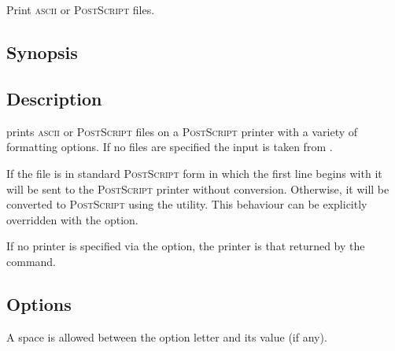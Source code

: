 
\newpage
\section{}
\label{pri}



Print \textsc{ascii} or \textsc{PostScript} files.

\subsection*{Synopsis}

\begin{synopsis}
\end{synopsis}

\subsection*{Description}

 prints \textsc{ascii} or \textsc{PostScript} files on a
\textsc{PostScript} printer with a variety of formatting options.  If no files
are specified the input is taken from .

If the file is in standard \textsc{PostScript} form in which the first line
begins with \code{\%!} it will be sent to the \textsc{PostScript} printer
without conversion.  Otherwise, it will be converted to \textsc{PostScript}
using the  utility.  This behaviour can be explicitly
overridden with the  option.

If no printer is specified via the  option, the printer is that
returned by the  command.

\subsection*{Options}

A space is allowed between the option letter and its value (if any).

